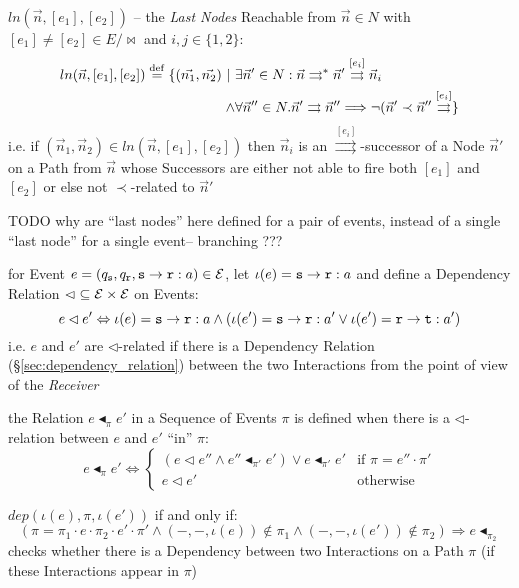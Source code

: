 $ln(\vec{n},[e_1],[e_2])$ -- the \emph{Last Nodes} Reachable from
$\vec{n} \in N$ with $[e_1] \neq [e_2] \in E/\bowtie$ and $i,j \in
\{1,2\}$:
\begin{align*}
  ln(\vec{n},[e_1],[e_2]) \stackrel{\mathrm{def}}= \{ (\vec{n_1},\vec{n_2}) \ |\ &
    \exists\vec{n}' \in N : \vec{n}\rightrightarrows^*\vec{n}'
        \stackrel{[e_i]}\rightrightarrows\vec{n}_i \\
    \wedge & \forall\vec{n}'' \in N . \vec{n}'\rightrightarrows\vec{n}''
        \Longrightarrow
          \neg(\vec{n}'\prec\vec{n}''\stackrel{[e_i]}\rightrightarrows
  \}
\end{align*}
i.e. if $(\vec{n}_1,\vec{n}_2) \in ln(\vec{n},[e_1],[e_2])$ then
$\vec{n}_i$ is an $\stackrel{[e_i]}\rightrightarrows$-successor of a
Node $\vec{n}'$ on a Path from $\vec{n}$ whose Successors are either
not able to fire both $[e_1]$ and $[e_2]$ or else not $\prec$-related
to $\vec{n}'$

TODO why are ``last nodes'' here defined for a pair of events, instead
of a single ``last node'' for a single event-- branching ???

for Event $e =
(q_\mathtt{s},q_\mathtt{r},\mathtt{s}\rightarrow\mathtt{r}:a) \in
\mathcal{E}$, let $\iota(e) = \mathtt{s}\rightarrow\mathtt{r}:a$ and
define a Dependency Relation $\lhd \subseteq \mathcal{E}\times\mathcal{E}$
on Events:
\[
  e \lhd e' \Leftrightarrow
    \iota(e) = \mathtt{s}\rightarrow\mathtt{r}:a \wedge
    (\iota(e') = \mathtt{s}\rightarrow\mathtt{r}:a' \vee
      \iota(e') = \mathtt{r}\rightarrow\mathtt{t}:a')
\]
i.e. $e$ and $e'$ are $\lhd$-related if there is a Dependency Relation
(\S\ref{sec:dependency_relation}) between the two Interactions from
the point of view of the \emph{Receiver} %

the Relation $e \blacktriangleleft_\pi e'$ in a Sequence of Events
$\pi$ is defined when there is a $\lhd$-relation between $e$ and $e'$
``in'' $\pi$:
\[
  e \blacktriangleleft_\pi e' \Leftrightarrow \begin{cases}
    (e \lhd e'' \wedge e'' \blacktriangleleft_{\pi'} e') \vee
      e \blacktriangleleft_{\pi'} e' & \text{if }\pi = e''\cdot\pi' \\
    e \lhd e' & \text{otherwise}
  \end{cases}
\]

$dep(\iota(e),\pi,\iota(e'))$ if and only if:
\[
  (\pi = \pi_1\cdot{e}\cdot\pi_2\cdot{e'}\cdot\pi' \wedge
    (-,-,\iota(e)) \notin \pi_1 \wedge (-,-,\iota(e'))\notin \pi_2)
  \Longrightarrow e \blacktriangleleft_{\pi_2}
\]
checks whether there is a Dependency between two Interactions on a
Path $\pi$ (if these Interactions appear in $\pi$)

